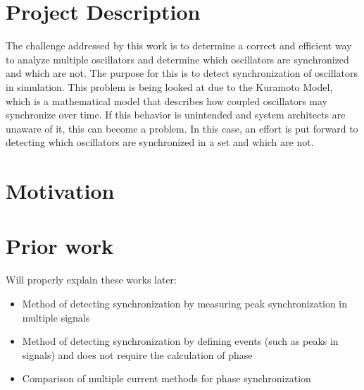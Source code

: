 \documentclass{article}
\begin{document}
\section{Project Description} %

The challenge addressed by this work is to determine a correct and efficient way to analyze multiple oscillators and determine which oscillators are synchronized and which are not. The purpose for this is to detect synchronization of oscillators in simulation. This problem is being looked at due to the Kuramoto Model, which is a mathematical model that describes how coupled oscillators may synchronize over time. If this behavior is unintended and system architects are unaware of it, this can become a problem. In this case, an effort is put forward to detecting which oscillators are synchronized in a set and which are not.


\section{Motivation} %



\section{Prior work} %
Will properly explain these works later:

\begin{itemize}
	\item Method of detecting synchronization by measuring peak synchronization in multiple signals \cite{biswas_2014}
	\item Method of detecting synchronization by defining events (such as peaks in signals) and does not require the calculation of phase \cite{quian_2002}
	\item Comparison of multiple current methods for phase synchronization \cite{yoshinaga_2022}
\end{itemize}
\end{document}
